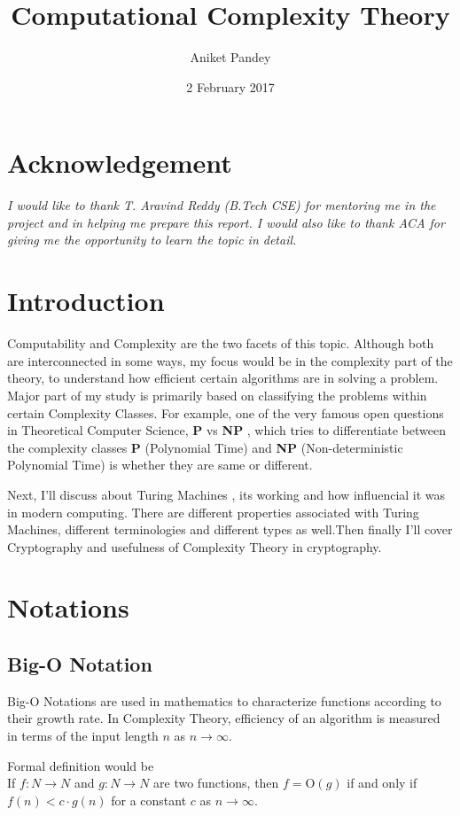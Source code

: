 \documentclass[12pt,a4paper]{extarticle}
\title{\textbf{Computational Complexity Theory}}
\date{2 February 2017}
\author{Aniket Pandey}
\begin{document}
\maketitle

\section{Acknowledgement}
\textit{I would like to thank T. Aravind Reddy (B.Tech CSE) for mentoring me in the project and in helping me prepare this report. I would also like to thank ACA for giving me the opportunity to learn the topic in detail.}

\section{Introduction}
Computability and Complexity are the two facets of this topic. 
Although both are interconnected in some ways, my focus would be in the complexity part of the theory, to understand how efficient certain algorithms are in solving a problem. 
Major part of my study is primarily based on classifying the problems within certain Complexity Classes. 
For example, one of the very famous open questions in Theoretical Computer Science, \textbf{P} vs \textbf{NP} , which tries to differentiate between the complexity classes \textbf{P} (Polynomial Time) and \textbf{NP} (Non-deterministic Polynomial Time) is whether they are same or different.\\ \par Next, I'll discuss about Turing Machines , its working and how influencial it was in modern computing. There are different properties associated with Turing Machines, different terminologies and different types as well.Then finally I'll cover Cryptography and usefulness of Complexity Theory in cryptography. 

\section{Notations}
\subsection{Big-O Notation}
Big-O Notations are used in mathematics to characterize functions according to their growth rate. In Complexity Theory, efficiency of an algorithm is measured in terms of the input length $n$ as $n\rightarrow \infty $.\par Formal definition would be\\If $f:N\rightarrow N$ and $g:N\rightarrow N$ are two functions, then $f=$O$(g)$ if and only if $f(n)<c \cdot g(n)$ for a constant $c$ as $n\rightarrow\infty$.
\newpage
\end{document}
